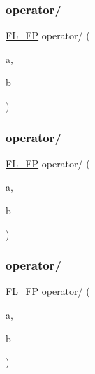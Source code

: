 \mbox{\label{class_f_l___f_p_a746b7c97a3194b33df5e6e04ce0ce5e8}} 
\subsubsection{\texorpdfstring{operator/}{operator/}\hspace{0.1cm}{\footnotesize\ttfamily [1/3]}}
{\footnotesize\ttfamily \hyperlink{class_f_l___f_p}{F\+L\+\_\+\+FP} operator/ (\begin{DoxyParamCaption}\item[{const \hyperlink{class_f_l___f_p}{F\+L\+\_\+\+FP} \&}]{a,  }\item[{const \hyperlink{class_f_l___f_p}{F\+L\+\_\+\+FP} \&}]{b }\end{DoxyParamCaption})\hspace{0.3cm}{\ttfamily [friend]}}

\mbox{\label{class_f_l___f_p_a10e4527f31f6a72dfc92215a83bbf439}} 
\subsubsection{\texorpdfstring{operator/}{operator/}\hspace{0.1cm}{\footnotesize\ttfamily [2/3]}}
{\footnotesize\ttfamily \hyperlink{class_f_l___f_p}{F\+L\+\_\+\+FP} operator/ (\begin{DoxyParamCaption}\item[{const \hyperlink{class_f_l___f_p}{F\+L\+\_\+\+FP} \&}]{a,  }\item[{const double \&}]{b }\end{DoxyParamCaption})\hspace{0.3cm}{\ttfamily [friend]}}

\mbox{\label{class_f_l___f_p_a748c3789021613fe839afe4289689f88}} 
\subsubsection{\texorpdfstring{operator/}{operator/}\hspace{0.1cm}{\footnotesize\ttfamily [3/3]}}
{\footnotesize\ttfamily \hyperlink{class_f_l___f_p}{F\+L\+\_\+\+FP} operator/ (\begin{DoxyParamCaption}\item[{const double \&}]{a,  }\item[{const \hyperlink{class_f_l___f_p}{F\+L\+\_\+\+FP} \&}]{b }\end{DoxyParamCaption})\hspace{0.3cm}{\ttfamily [friend]}}


